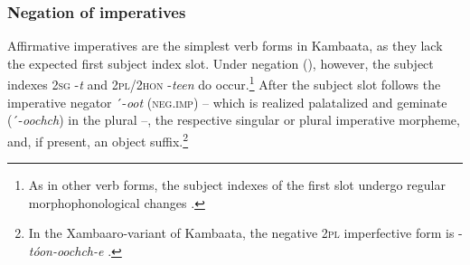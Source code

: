 \documentclass[output=paper,colorlinks,citecolor=brown,draftmode
]{langscibook}
\begin{document}
\subsubsection{Negation of imperatives}\label{sec:treis:2.2.1}

Affirmative imperatives are the simplest verb forms in Kambaata, as they lack the expected first subject index slot. Under negation (), however, the subject indexes \textsc{2sg} -\textit{t} and \textsc{2pl/2hon} -\textit{teen} do occur.\footnote{As in other verb forms, the subject indexes of the first slot undergo regular morphophonological changes \citep[60--72]{Treis2008}.}  After the subject slot follows the imperative negator ´-\textit{oot} (\textsc{neg.imp}) – which is realized palatalized and geminate (´-\textit{oochch}) in the plural –, the respective singular  or plural  imperative morpheme, and, if present, an object suffix.\footnote{In the Xambaaro-variant of Kambaata, the negative \textsc{2pl} imperfective form is -\textit{tóon-oochch-e} \citep[99]{KorhonenEtAl1986}.} 
\end{document}
